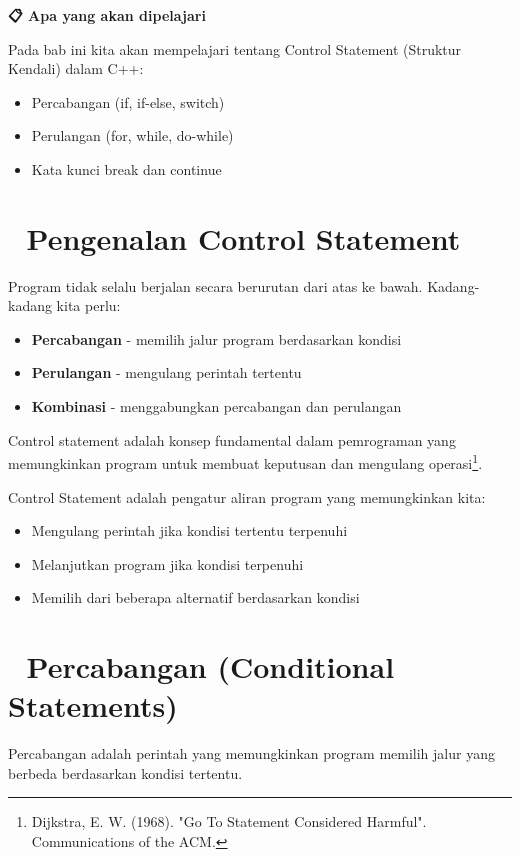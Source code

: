 \textbf{📋 Apa yang akan dipelajari}

Pada bab ini kita akan mempelajari tentang Control Statement (Struktur Kendali) dalam C++:

\begin{itemize}
\item Percabangan (if, if-else, switch)
\item Perulangan (for, while, do-while)
\item Kata kunci break dan continue
\end{itemize}

\minitoc

\section{🎯 Pengenalan Control Statement}

Program tidak selalu berjalan secara berurutan dari atas ke bawah. Kadang-kadang kita perlu:
\begin{itemize}
\item \textbf{Percabangan} - memilih jalur program berdasarkan kondisi
\item \textbf{Perulangan} - mengulang perintah tertentu
\item \textbf{Kombinasi} - menggabungkan percabangan dan perulangan
\end{itemize}

Control statement adalah konsep fundamental dalam pemrograman yang memungkinkan program untuk membuat keputusan dan mengulang operasi\footnote{Dijkstra, E. W. (1968). "Go To Statement Considered Harmful". Communications of the ACM.}.

Control Statement adalah pengatur aliran program yang memungkinkan kita:
\begin{itemize}
\item Mengulang perintah jika kondisi tertentu terpenuhi
\item Melanjutkan program jika kondisi terpenuhi
\item Memilih dari beberapa alternatif berdasarkan kondisi
\end{itemize}

\section{🔄 Percabangan (Conditional Statements)}\label{percabangan}

Percabangan adalah perintah yang memungkinkan program memilih jalur yang berbeda berdasarkan kondisi tertentu. 

